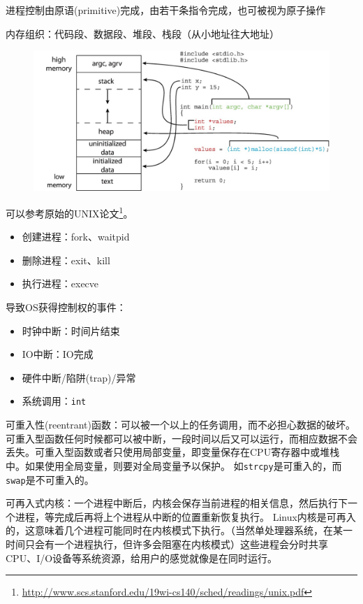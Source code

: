 进程控制由原语(primitive)完成，由若干条指令完成，也可被视为原子操作

内存组织：代码段、数据段、堆段、栈段（从小地址往大地址）
\begin{figure}[H]
\centering
\includegraphics[width=0.8\linewidth]{fig/C_memory.jpg}
\end{figure}

可以参考原始的UNIX论文\footnote{\url{http://www.scs.stanford.edu/19wi-cs140/sched/readings/unix.pdf}}。
\begin{itemize}
	\item 创建进程：fork、waitpid
	\item 删除进程：exit、kill
	\item 执行进程：execve
\end{itemize}


导致OS获得控制权的事件：
\begin{itemize}
	\item 时钟中断：时间片结束
	\item IO中断：IO完成
	\item 硬件中断/陷阱(trap)/异常
	\item 系统调用：\verb'int'
\end{itemize}

\par ​​​​​​​可重入性(reentrant)函数：可以被一个以上的任务调用，而不必担心数据的破坏。可重入型函数任何时候都可以被中断，一段时间以后又可以运行，而相应数据不会丢失。可重入型函数或者只使用局部变量，即变量保存在CPU寄存器中或堆栈中。如果使用全局变量，则要对全局变量予以保护。
如\verb'strcpy'是可重入的，而\verb'swap'是不可重入的。

可再入式内核：一个进程中断后，内核会保存当前进程的相关信息，然后执行下一个进程，等完成后再将上个进程从中断的位置重新恢复执行。
Linux内核是可再入的，这意味着几个进程可能同时在内核模式下执行。（当然单处理器系统，在某一时间只会有一个进程执行，但许多会阻塞在内核模式）这些进程会分时共享CPU、I/O设备等系统资源，给用户的感觉就像是在同时运行。